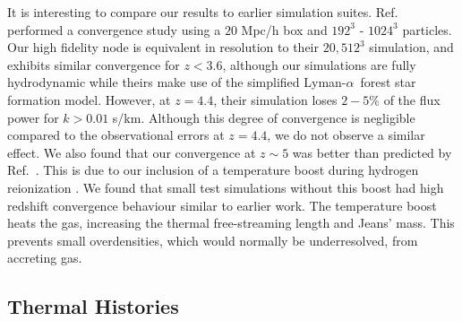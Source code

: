 \documentclass[a4paper,11pt]{article}
\newcommand{\spb}[1]{{\textcolor{magenta}{[{\bf SPB}: #1]}}}
\newcommand{\Lya}{Lyman-$\alpha$}
\begin{document}
It is interesting to compare our results to earlier simulation suites. Ref.~\cite{Borde:2014} performed a convergence study using a $20$ Mpc/h box and $192^3$ - $1024^3$ particles. Our high fidelity node is equivalent in resolution to their $20, 512^3$ simulation, and exhibits similar convergence for $z < 3.6$, although our simulations are fully hydrodynamic while theirs make use of the simplified \Lya~forest star formation model. However, at $z=4.4$, their simulation loses $2-5\%$ of the flux power for $k > 0.01$ s/km. Although this degree of convergence is negligible compared to the observational errors at $z=4.4$, we do not observe a similar effect.
We also found that our convergence at $z \sim 5$ was better than predicted by Ref.~\cite{2009MNRAS.398L..26B}. This is due to our inclusion of a temperature boost during hydrogen reionization \cite{DAloisio:2019}. We found that small test simulations without this boost had high redshift convergence behaviour similar to earlier work. The temperature boost heats the gas, increasing the thermal free-streaming length and Jeans' mass. This prevents small overdensities, which would normally be underresolved, from accreting gas.



\subsection{Thermal Histories}
\end{document}
